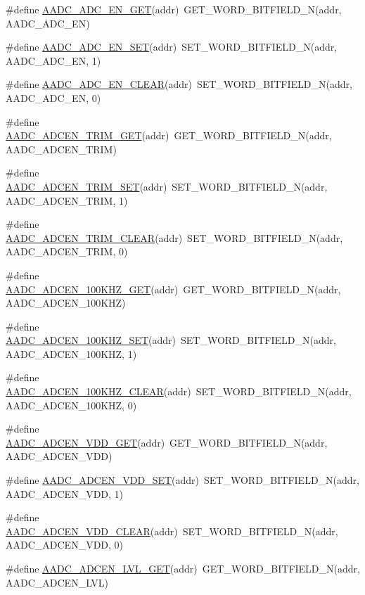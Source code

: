 \begin{DoxyCompactItemize}
\item 
\#define \hyperlink{a00542_a74da7fd8abf443fb4873eaff97644fc7}{AADC\_\-ADC\_\-EN\_\-GET}(addr)~GET\_\-WORD\_\-BITFIELD\_\-N(addr, AADC\_\-ADC\_\-EN)
\item 
\#define \hyperlink{a00542_a10ebd06cad4c00f52dfbcbf8a193fd58}{AADC\_\-ADC\_\-EN\_\-SET}(addr)~SET\_\-WORD\_\-BITFIELD\_\-N(addr, AADC\_\-ADC\_\-EN, 1)
\item 
\#define \hyperlink{a00542_a2f5040c530bf6fdd14a89bce7f96304e}{AADC\_\-ADC\_\-EN\_\-CLEAR}(addr)~SET\_\-WORD\_\-BITFIELD\_\-N(addr, AADC\_\-ADC\_\-EN, 0)
\item 
\#define \hyperlink{a00542_a9592b840bf26725b706b692ee49cc478}{AADC\_\-ADCEN\_\-TRIM\_\-GET}(addr)~GET\_\-WORD\_\-BITFIELD\_\-N(addr, AADC\_\-ADCEN\_\-TRIM)
\item 
\#define \hyperlink{a00542_a9f061ba10701f46f29fb733bcf564e6c}{AADC\_\-ADCEN\_\-TRIM\_\-SET}(addr)~SET\_\-WORD\_\-BITFIELD\_\-N(addr, AADC\_\-ADCEN\_\-TRIM, 1)
\item 
\#define \hyperlink{a00542_a654edaf55bd5d2de37ad75eb5271e17d}{AADC\_\-ADCEN\_\-TRIM\_\-CLEAR}(addr)~SET\_\-WORD\_\-BITFIELD\_\-N(addr, AADC\_\-ADCEN\_\-TRIM, 0)
\item 
\#define \hyperlink{a00542_a950d59b3e53f12e98da2a33458047b8e}{AADC\_\-ADCEN\_\-100KHZ\_\-GET}(addr)~GET\_\-WORD\_\-BITFIELD\_\-N(addr, AADC\_\-ADCEN\_\-100KHZ)
\item 
\#define \hyperlink{a00542_a41c98a02971e000be17036ff3153ff52}{AADC\_\-ADCEN\_\-100KHZ\_\-SET}(addr)~SET\_\-WORD\_\-BITFIELD\_\-N(addr, AADC\_\-ADCEN\_\-100KHZ, 1)
\item 
\#define \hyperlink{a00542_ac4878aa927d9e397f7529fb00e25ced9}{AADC\_\-ADCEN\_\-100KHZ\_\-CLEAR}(addr)~SET\_\-WORD\_\-BITFIELD\_\-N(addr, AADC\_\-ADCEN\_\-100KHZ, 0)
\item 
\#define \hyperlink{a00542_af42e82c5b760ad181806985eed0e25d8}{AADC\_\-ADCEN\_\-VDD\_\-GET}(addr)~GET\_\-WORD\_\-BITFIELD\_\-N(addr, AADC\_\-ADCEN\_\-VDD)
\item 
\#define \hyperlink{a00542_aac3a2cf2c0c9cec81abbeeae81fcbbf0}{AADC\_\-ADCEN\_\-VDD\_\-SET}(addr)~SET\_\-WORD\_\-BITFIELD\_\-N(addr, AADC\_\-ADCEN\_\-VDD, 1)
\item 
\#define \hyperlink{a00542_aa5bf6464aa32ae0cb397256c17bcde00}{AADC\_\-ADCEN\_\-VDD\_\-CLEAR}(addr)~SET\_\-WORD\_\-BITFIELD\_\-N(addr, AADC\_\-ADCEN\_\-VDD, 0)
\item 
\#define \hyperlink{a00542_a441cb78dc3e2664e27d2f5ec8cf4c1ba}{AADC\_\-ADCEN\_\-LVL\_\-GET}(addr)~GET\_\-WORD\_\-BITFIELD\_\-N(addr, AADC\_\-ADCEN\_\-LVL)

\end{DoxyCompactItemize}
